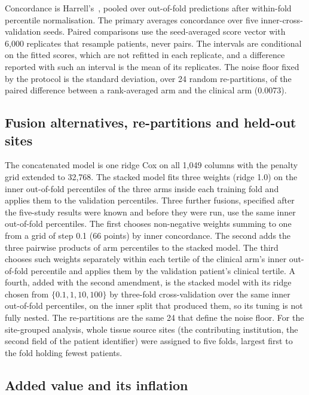 \documentclass[pdflatex,sn-nature]{sn-jnl}
\begin{document}
Concordance is Harrell's~\citep{harrell1982cindex}, pooled over
out-of-fold predictions after within-fold percentile normalisation. The primary averages concordance
over five inner-cross-validation seeds. Paired comparisons use the seed-averaged score vector with
6,000 replicates that resample patients, never pairs. The intervals are conditional on the fitted
scores, which are not refitted in each replicate, and a difference reported with such an interval is
the mean of its replicates. The noise floor fixed by the protocol is the standard deviation, over 24
random re-partitions, of the paired difference between a rank-averaged arm and the clinical arm
(0.0073).

\subsection*{Fusion alternatives, re-partitions and held-out sites}

The concatenated model is one ridge Cox on all 1,049 columns with the penalty grid extended to
32,768. The stacked model fits three weights (ridge 1.0) on the inner
out-of-fold percentiles of the three arms inside each training fold and applies them to the
validation percentiles. Three further fusions, specified after the five-study results were known and
before they were run, use the same inner out-of-fold percentiles. The first chooses non-negative
weights summing to one from a grid of step 0.1 (66 points) by inner concordance. The second adds the
three pairwise products of arm percentiles to the stacked model. The third chooses such weights
separately within each tertile of the clinical arm's inner out-of-fold percentile and applies them by
the validation patient's clinical tertile. A fourth, added with the second amendment, is the stacked
model with its ridge chosen from $\{0.1, 1, 10, 100\}$ by three-fold cross-validation over the same
inner out-of-fold percentiles, on the inner split that produced them, so its tuning is not fully
nested. The re-partitions are the same 24 that define the noise floor. For the
site-grouped analysis, whole tissue source sites (the contributing institution, the second field of
the patient identifier) were assigned to five folds, largest first to the fold holding fewest
patients.

\subsection*{Added value and its inflation}
\end{document}
